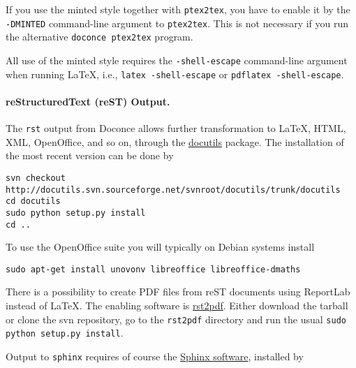 \documentclass[%
oneside,                 %
final,                   %
10pt]{article}
\begin{document}
If you use the minted style together with {\fontsize{10pt}{10pt}\Verb!ptex2tex!}, you have to
enable it by the {\fontsize{10pt}{10pt}\Verb!-DMINTED!} command-line argument to {\fontsize{10pt}{10pt}\Verb!ptex2tex!}.
This is not necessary if you run the alternative {\fontsize{10pt}{10pt}\Verb!doconce ptex2tex!} program.

All
use of the minted style requires the {\fontsize{10pt}{10pt}\Verb!-shell-escape!} command-line
argument when running {\LaTeX}, i.e., {\fontsize{10pt}{10pt}\Verb!latex -shell-escape!} or {\fontsize{10pt}{10pt}\Verb!pdflatex -shell-escape!}.


\paragraph{reStructuredText (reST) Output.}
The {\fontsize{10pt}{10pt}\Verb!rst!} output from Doconce allows further transformation to {\LaTeX},
HTML, XML, OpenOffice, and so on, through the \href{{http://docutils.sourceforge.net}}{docutils} package.  The installation of the
most recent version can be done by

\vspace{4pt}
\begin{Verbatim}[numbers=none,frame=lines,label=\fbox{{\tiny Terminal}},fontsize=\fontsize{9pt}{9pt},
labelposition=topline,framesep=2.5mm,framerule=0.7pt]
svn checkout http://docutils.svn.sourceforge.net/svnroot/docutils/trunk/docutils
cd docutils
sudo python setup.py install
cd ..
\end{Verbatim}
To use the OpenOffice suite you will typically on Debian systems install
\vspace{4pt}
\begin{Verbatim}[numbers=none,frame=lines,label=\fbox{{\tiny Terminal}},fontsize=\fontsize{9pt}{9pt},
labelposition=topline,framesep=2.5mm,framerule=0.7pt]
sudo apt-get install unovonv libreoffice libreoffice-dmaths
\end{Verbatim}

There is a possibility to create PDF files from reST documents
using ReportLab instead of {\LaTeX}. The enabling software is
\href{{http://code.google.com/p/rst2pdf}}{rst2pdf}. Either download the tarball
or clone the svn repository, go to the {\fontsize{10pt}{10pt}\Verb!rst2pdf!} directory and
run the usual {\fontsize{10pt}{10pt}\Verb!sudo python setup.py install!}.


Output to {\fontsize{10pt}{10pt}\Verb!sphinx!} requires of course the
\href{{http://sphinx.pocoo.org}}{Sphinx software},
installed by
\end{document}
